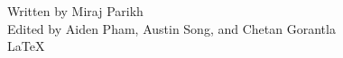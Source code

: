 \documentclass{article}
\begin{document}






\vfill\raggedleft
Written by Miraj Parikh\\ %
Edited by Aiden Pham, Austin Song, and Chetan Gorantla\\
\oldpilcrowfive\LaTeX
\end{document}
